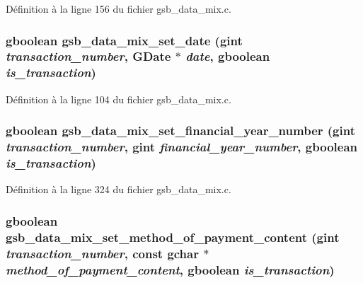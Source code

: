 Définition à la ligne 156 du fichier gsb\_\-data\_\-mix.c.

\subsubsection[{gsb\_\-data\_\-mix\_\-set\_\-date}]{\setlength{\rightskip}{0pt plus 5cm}gboolean gsb\_\-data\_\-mix\_\-set\_\-date (gint {\em transaction\_\-number}, \/  GDate $\ast$ {\em date}, \/  gboolean {\em is\_\-transaction})}\label{gsb__data__mix_8h_a57c125cb2e58f59ed3b7ee5148eca14c}


Définition à la ligne 104 du fichier gsb\_\-data\_\-mix.c.

\subsubsection[{gsb\_\-data\_\-mix\_\-set\_\-financial\_\-year\_\-number}]{\setlength{\rightskip}{0pt plus 5cm}gboolean gsb\_\-data\_\-mix\_\-set\_\-financial\_\-year\_\-number (gint {\em transaction\_\-number}, \/  gint {\em financial\_\-year\_\-number}, \/  gboolean {\em is\_\-transaction})}\label{gsb__data__mix_8h_a8530f9bcbd47edb4c920160f1e8d4594}


Définition à la ligne 324 du fichier gsb\_\-data\_\-mix.c.

\subsubsection[{gsb\_\-data\_\-mix\_\-set\_\-method\_\-of\_\-payment\_\-content}]{\setlength{\rightskip}{0pt plus 5cm}gboolean gsb\_\-data\_\-mix\_\-set\_\-method\_\-of\_\-payment\_\-content (gint {\em transaction\_\-number}, \/  const gchar $\ast$ {\em method\_\-of\_\-payment\_\-content}, \/  gboolean {\em is\_\-transaction})}\label{gsb__data__mix_8h_ad35a8d6c8628a64b60cbda3cef75dac7}


